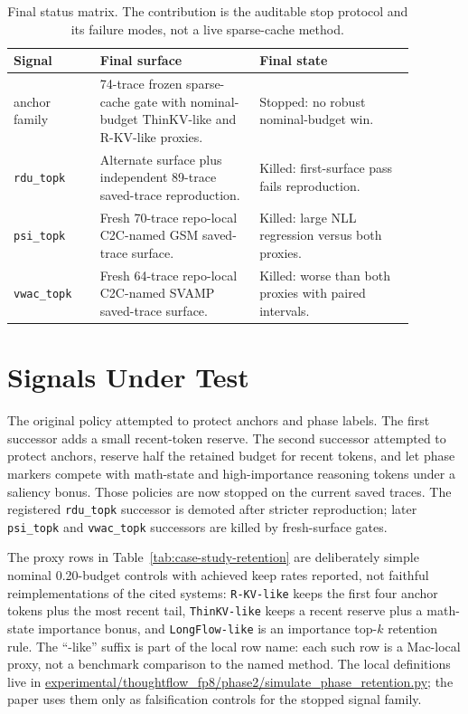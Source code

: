 \documentclass{article}
\begin{document}
\begin{table}[h]
\centering
\small
\begin{tabular}{p{0.19\linewidth}p{0.35\linewidth}p{0.34\linewidth}}
\toprule
Signal & Final surface & Final state \\
\midrule
anchor family & 74-trace frozen sparse-cache gate with nominal-budget ThinKV-like and R-KV-like proxies. & Stopped: no robust nominal-budget win. \\
\texttt{rdu\_topk} & Alternate surface plus independent 89-trace saved-trace reproduction. & Killed: first-surface pass fails reproduction. \\
\texttt{psi\_topk} & Fresh 70-trace repo-local C2C-named GSM saved-trace surface. & Killed: large NLL regression versus both proxies. \\
\texttt{vwac\_topk} & Fresh 64-trace repo-local C2C-named SVAMP saved-trace surface. & Killed: worse than both proxies with paired intervals. \\
\bottomrule
\end{tabular}
\caption{Final status matrix. The contribution is the auditable stop protocol
and its failure modes, not a live sparse-cache method.}
\end{table}

\section{Signals Under Test}

The original policy attempted to protect anchors and phase labels. The first successor adds a small recent-token reserve. The second successor attempted to protect anchors, reserve half the retained budget for recent tokens, and let phase markers compete with math-state and high-importance reasoning tokens under a saliency bonus. Those policies are now stopped on the current saved traces. The registered \texttt{rdu\_topk} successor is demoted after stricter reproduction; later \texttt{psi\_topk} and \texttt{vwac\_topk} successors are killed by fresh-surface gates.

The proxy rows in Table~\ref{tab:case-study-retention} are deliberately simple
nominal 0.20-budget controls with achieved keep rates reported, not faithful
reimplementations of the cited systems:
\texttt{R-KV-like} keeps the first four anchor tokens plus the most recent tail,
\texttt{ThinKV-like} keeps a recent reserve plus a math-state importance bonus,
and \texttt{LongFlow-like} is an importance top-$k$ retention rule. The ``-like''
suffix is part of the local row name: each such row is a Mac-local proxy, not a
benchmark comparison to the named method. The local
definitions live in
\url{experimental/thoughtflow_fp8/phase2/simulate_phase_retention.py}; the
paper uses them only as falsification controls for the stopped signal family.
\end{document}
